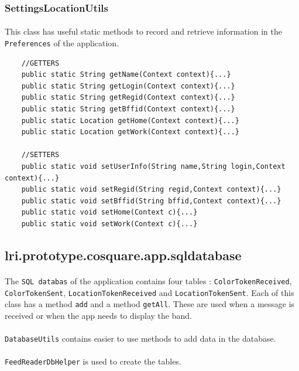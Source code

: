 \documentclass[12pt]{article}
\begin{document}
\subsubsection{SettingsLocationUtils}
\paragraph{}This class has useful static methods to record and retrieve information in the \verb?Preferences? of the application.

\begin{verbatim}
    //GETTERS
    public static String getName(Context context){...}
    public static String getLogin(Context context){...}
    public static String getRegid(Context context){...}
    public static String getBffid(Context context){...}
    public static Location getHome(Context context){...}
    public static Location getWork(Context context){...}

    //SETTERS
    public static void setUserInfo(String name,String login,Context context){...}
    public static void setRegid(String regid,Context context){...}
    public static void setBffid(String bffid,Context context){...}
    public static void setHome(Context c){...}
    public static void setWork(Context c){...}
\end{verbatim}


\subsection{lri.prototype.cosquare.app.sqldatabase}
\paragraph{}The \verb?SQL databas? of the application contains four tables :
\verb?ColorTokenReceived?, \verb?ColorTokenSent?, \verb?LocationTokenReceived? and \verb?LocationTokenSent?. Each of this class has a method \verb?add? and a method \verb?getAll?. These are used when a message is received or when the app needs to display the band.

\paragraph{}\verb?DatabaseUtils? contains easier to use methods to add data in the database. \paragraph{}\verb?FeedReaderDbHelper? is used to create the tables.
\end{document}
